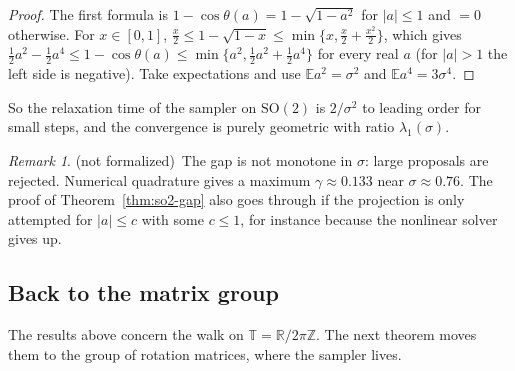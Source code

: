 \documentclass[11pt]{amsart}
\theoremstyle{definition}
\theoremstyle{remark}
\newtheorem{remark}[theorem]{Remark}
\newcommand{\notformal}{\textup{(not formalized)}}
\newcommand{\R}{\mathbb{R}}
\newcommand{\Z}{\mathbb{Z}}
\newcommand{\T}{\mathbb{T}}
\newcommand{\E}{\mathbb{E}}
\newcommand{\SO}{\mathrm{SO}}
\begin{document}
\begin{proof}
The first formula is $1-\cos\theta(a)=1-\sqrt{1-a^2}$ for $|a|\le1$ and $=0$ otherwise.  For
$x\in[0,1]$, $\tfrac x2\le1-\sqrt{1-x}\le\min\{x,\tfrac x2+\tfrac{x^2}2\}$, which gives
$\tfrac12a^2-\tfrac12a^4\le1-\cos\theta(a)\le\min\{a^2,\tfrac12a^2+\tfrac12a^4\}$ for every real
$a$ (for $|a|>1$ the left side is negative).  Take expectations and use $\E a^2=\sigma^2$ and
$\E a^4=3\sigma^4$.
\end{proof}

So the relaxation time of the sampler on $\SO(2)$ is $2/\sigma^2$ to leading order for small
steps, and the convergence is purely geometric with ratio $\lambda_1(\sigma)$.

\begin{remark}\label{rem:so2-numerics}
\notformal\ The gap is not monotone in $\sigma$: large proposals are rejected.  Numerical
quadrature gives a maximum $\gamma\approx0.133$ near $\sigma\approx0.76$.  The proof of
Theorem~\ref{thm:so2-gap} also goes through if the projection is only attempted for
$|a|\le c$ with some $c\le1$, for instance because the nonlinear solver gives up.
\end{remark}

\subsection{Back to the matrix group}\label{sec:so2-matrix}
The results above concern the walk on $\T=\R/2\pi\Z$.  The next theorem moves them to the group
of rotation matrices, where the sampler lives.
\end{document}
